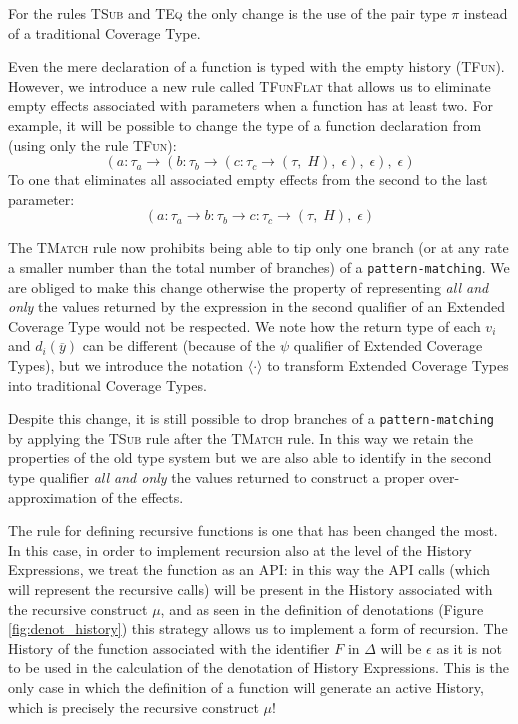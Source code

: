 For the rules \textsc{TSub} and \textsc{TEq} the only change is the use of the pair type $\pi$ instead of a traditional Coverage Type.

Even the mere declaration of a function is typed with the empty history (\textsc{TFun}). However, we introduce a new rule called \textsc{TFunFlat} that allows us to eliminate empty effects associated with parameters when a function has at least two. For example, it will be possible to change the type of a function declaration from (using only the rule \textsc{TFun}):
\begin{equation}
    (a{:}\tau_a \rightarrow (b{:}\tau_b \rightarrow (c{:}\tau_c \rightarrow (\tau, \;H), \;\epsilon), \;\epsilon), \;\epsilon)
\end{equation}
To one that eliminates all associated empty effects from the second to the last parameter:
\begin{equation}
    (a{:}\tau_a \rightarrow b{:}\tau_b \rightarrow c{:}\tau_c \rightarrow (\tau, \;H), \;\epsilon)
\end{equation}

The \textsc{TMatch} rule now prohibits being able to tip only one branch (or at any rate a smaller number than the total number of branches) of a \verb|pattern-matching|. We are obliged to make this change otherwise the property of representing \emph{all and only} the values returned by the expression in the second qualifier of an Extended Coverage Type would not be respected.
We note how the return type of each $v_i$ and $d_i(\overline{y})$ can be different (because of the $\psi$ qualifier of Extended Coverage Types), but we introduce the notation $\langle \cdot \rangle$ to transform Extended Coverage Types into traditional Coverage Types.

Despite this change, it is still possible to drop branches of a \verb|pattern-matching| by applying the \textsc{TSub} rule after the \textsc{TMatch} rule. In this way we retain the properties of the old type system but we are also able to identify in the second type qualifier \emph{all and only} the values returned to construct a proper over-approximation of the effects.

The rule for defining recursive functions is one that has been changed the most. In this case, in order to implement recursion also at the level of the History Expressions, we treat the function as an API: in this way the API calls (which will represent the recursive calls) will be present in the History associated with the recursive construct $\mu$, and as seen in the definition of denotations (Figure \ref{fig:denot_history}) this strategy allows us to implement a form of recursion. The History of the function associated with the identifier $F$ in $\Delta$ will be $\epsilon$ as it is not to be used in the calculation of the denotation of History Expressions. This is the only case in which the definition of a function will generate an active History, which is precisely the recursive construct $\mu$!

